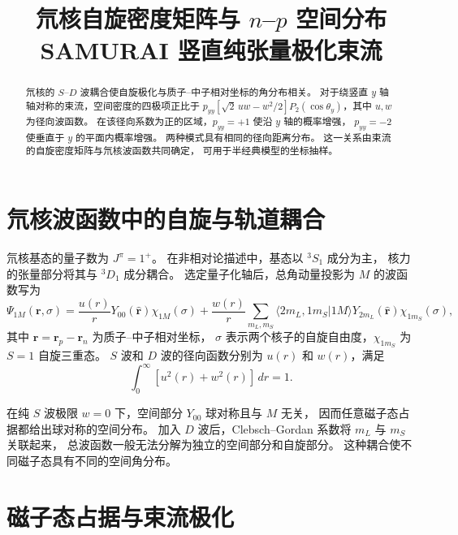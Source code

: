 \documentclass[11pt,a4paper]{ctexart}
\title{\textbf{氘核自旋密度矩阵与 $n$--$p$ 空间分布}\\
\large SAMURAI 竖直纯张量极化束流}
\author{}
\date{}
\begin{document}
\maketitle

\begin{abstract}
氘核的 $S$--$D$ 波耦合使自旋极化与质子--中子相对坐标的角分布相关。
对于绕竖直 $y$ 轴轴对称的束流，空间密度的四极项正比于
$p_{yy}[\sqrt2\,uw-w^2/2]P_2(\cos\theta_y)$，其中 $u,w$ 为径向波函数。
在该径向系数为正的区域，$p_{yy}=+1$ 使沿 $y$ 轴的概率增强，
$p_{yy}=-2$ 使垂直于 $y$ 的平面内概率增强。
两种模式具有相同的径向距离分布。
这一关系由束流的自旋密度矩阵与氘核波函数共同确定，
可用于半经典模型的坐标抽样。
\end{abstract}

\section{氘核波函数中的自旋与轨道耦合}

氘核基态的量子数为 $J^\pi=1^+$。
在非相对论描述中，基态以 ${}^3S_1$ 成分为主，
核力的张量部分将其与 ${}^3D_1$ 成分耦合。
选定量子化轴后，总角动量投影为 $M$ 的波函数写为
\begin{equation}
\Psi_{1M}(\bm r,\sigma)
=
\frac{u(r)}{r}Y_{00}(\hat{\bm r})\chi_{1M}(\sigma)
+
\frac{w(r)}{r}
\sum_{m_L,m_S}
\langle 2m_L,1m_S|1M\rangle
Y_{2m_L}(\hat{\bm r})\chi_{1m_S}(\sigma),
\label{eq:deuteronwf}
\end{equation}
其中 $\bm r=\bm r_p-\bm r_n$ 为质子--中子相对坐标，
$\sigma$ 表示两个核子的自旋自由度，$\chi_{1m_S}$ 为 $S=1$ 自旋三重态。
$S$ 波和 $D$ 波的径向函数分别为 $u(r)$ 和 $w(r)$，满足
\[
\int_0^\infty [u^2(r)+w^2(r)]\,dr=1.
\]

在纯 $S$ 波极限 $w=0$ 下，空间部分 $Y_{00}$ 球对称且与 $M$ 无关，
因而任意磁子态占据都给出球对称的空间分布。
加入 $D$ 波后，Clebsch--Gordan 系数将 $m_L$ 与 $m_S$ 关联起来，
总波函数一般无法分解为独立的空间部分和自旋部分。
这种耦合使不同磁子态具有不同的空间角分布。

\section{磁子态占据与束流极化}
\end{document}
